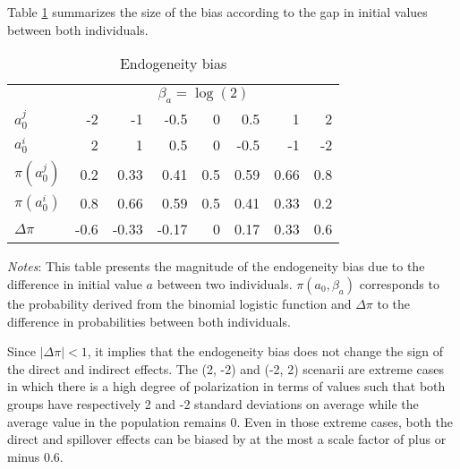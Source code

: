Table \ref{chap3-tab:gap-a0} summarizes the size of the bias according to the gap in initial values between both individuals.
\begin{table}[!tb]
    \centering
    \caption{Endogeneity bias}
    \label{chap3-tab:gap-a0}
    \begin{threeparttable}
        \setlength{\tabcolsep}{9pt}{}
        \begin{tabular}{lrrrrrrr}
            \toprule 
            & \multicolumn{7}{c}{$\beta_a = \log(2)$} \\
            \cmidrule(lr){2-8}
            $a_0^j$ & -2 & -1 & -0.5 & 0 & 0.5 & 1 & 2\\
            $a_0^i$ & 2 & 1 & 0.5 & 0 & -0.5 & -1 & -2\\
            \midrule
            $\pi(a_0^j)$ & 0.2 & 0.33 & 0.41 & 0.5 & 0.59 & 0.66 & 0.8\\
            $\pi(a_0^i)$ & 0.8 & 0.66 & 0.59 & 0.5 & 0.41 & 0.33 & 0.2\\
            \midrule
            $\Delta\pi$ & -0.6 & -0.33 & -0.17 & 0 & 0.17 & 0.33 & 0.6\\
            \bottomrule
        \end{tabular}
        \begin{tablenotes}[flushleft]
            \footnotesize{\item \textit{Notes}: This table presents the magnitude of the endogeneity bias due to the difference in initial value $a$ between two individuals. $\pi(a_0, \beta_a)$ corresponds to the probability derived from the binomial logistic function and $\Delta\pi$ to the difference in probabilities between both individuals.}
        \end{tablenotes}
    \end{threeparttable}
\end{table}
Since $\lvert \Delta\pi \rvert < 1$, it implies that the endogeneity bias does not change the sign of the direct and indirect effects. 
The (2, -2) and (-2, 2) scenarii are extreme cases in which there is a high degree of polarization in terms of values such that both groups have respectively 2 and -2 standard deviations on average while the average value in the population remains 0. Even in those extreme cases, both the direct and spillover effects can be biased by at the most a scale factor of plus or minus $0.6$.